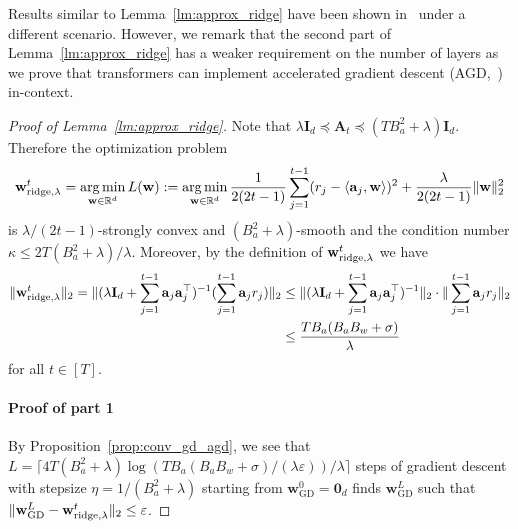 \documentclass[10pt]{article}
\newcommand{\id}{\bI}
\newcommand{\eps}{\varepsilon}
\DeclareMathOperator*{\argmin}{arg\,min}
\newcommand{\<}{\left\langle}
\renewcommand{\>}{\right\rangle}
\newcommand{\bzero}{{\mathbf 0}}
\newcommand{\ridge}{{\rm ridge}}
\newcommand{\R}{\mathbb{R}}
\newcommand{\GD}{{\mathrm{GD}}}
\def\bA{{\mathbf A}}
\def\bI{{\mathbf I}}
\def\ba{{\mathbf a}}
\def\bw{{\mathbf w}}
\begin{document}
Results similar to Lemma~\ref{lm:approx_ridge} have been shown in~\cite{bai2023transformers} under a different scenario.   However, we remark that  the second part of Lemma~\ref{lm:approx_ridge} has a weaker requirement on the number of layers as we prove that transformers can implement accelerated gradient descent (AGD,~\cite{nesterov2003introductory}) in-context.


\begin{proof}[Proof of Lemma~\ref{lm:approx_ridge}]
Note that $\lambda\id_d\preceq \bA_t\preceq (TB_a^2+\lambda)\id_d$. Therefore the optimization problem 
$$\bw^t_{\ridge,\lambda}=\argmin_{\bw\in\R^d}L(\bw):=\argmin_{\bw\in\R^d}\frac{1}{2(2t-1)}\sum_{j=1}^{t-1}(r_j-\<\ba_j,\bw\>)^2+\frac{\lambda}{2(2t-1)}\|\bw\|_2^2$$
is $\lambda/(2t-1)$-strongly convex  and $(B_a^2+\lambda)$-smooth and the condition number $\kappa\leq 2T(B_a^2+\lambda)/\lambda$. Moreover, by the definition of $\bw_{\ridge,\lambda}^t$ we have 
\begin{align*}
    \|\bw^t_{\ridge,\lambda}\|_2=\|(\lambda\id_d+\sum_{j=1}^{t-1}\ba_j\ba_j^\top)^{-1}(\sum_{j=1}^{t-1}\ba_jr_j)\|_2&\leq 
    \|(\lambda\id_d+\sum_{j=1}^{t-1}\ba_j\ba_j^\top)^{-1}\|_2\cdot\|\sum_{j=1}^{t-1}\ba_jr_j\|_2\\&\leq
    \frac{TB_a(B_aB_w+\sigma)}{\lambda}
\end{align*} 
for all $t\in[T]$. 
\paragraph{Proof of part 1}
By Proposition~\ref{prop:conv_gd_agd}, we see that $L=\lceil4T(B_a^2+\lambda)\log({TB_a(B_aB_w+\sigma)}/({\lambda}\eps))/\lambda\rceil$ steps of gradient descent with stepsize $\eta=1/(B_a^2+\lambda)$ starting from $\bw_{\GD}^0=\bzero_d$ finds $\bw^L_\GD$ such that $\|\bw^L_{\GD}-\bw^t_{\ridge,\lambda}\|_2\leq\eps$.


\end{proof}
\end{document}
